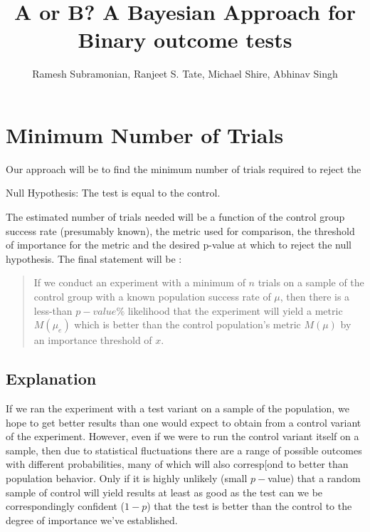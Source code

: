 \documentclass[12pt]{report}
\begin{document}
\title{A or B? A Bayesian Approach for Binary outcome tests}
\author{Ramesh Subramonian, Ranjeet S. Tate, Michael Shire, Abhinav Singh}
\date{}
\maketitle

\section{Minimum Number of Trials}

Our approach will be to find the minimum number of trials required to
reject the

Null Hypothesis: The test is equal to the control. 

The estimated number of trials needed will be a function of the control
group success rate (presumably known), the metric used
for comparison, the threshold of importance for the metric and the
desired p-value at which to reject the null hypothesis. The final
statement will be :
\begin{quote}
  If we conduct an experiment with a minimum of \(n\) trials on a sample of the
  control group with a known population success rate of \(\mu\),
  then there is a less-than \(p-value\%\) likelihood that the experiment
  will yield a metric \(M(\mu_e)\) which is better than the
  control population's metric \(M(\mu)\) by an importance threshold of \(x\).
\end{quote}

\subsection{Explanation}
If we ran the experiment with a test variant on a sample of the population,
we hope to get better results than one would expect to obtain from a
control variant of the experiment. However, even if we were to run the
control variant itself on a sample, then due to statistical fluctuations
there are a range of possible outcomes with different probabilities,
many of which will also corresp[ond to better than population behavior. Only
if it is highly unlikely (small \(p-\)value) that a random sample of control
will yield results at least as good as the test can we be correspondingly
confident (\(1-p\)) that the test is better than the control to the
degree of importance we've established.
\end{document}
